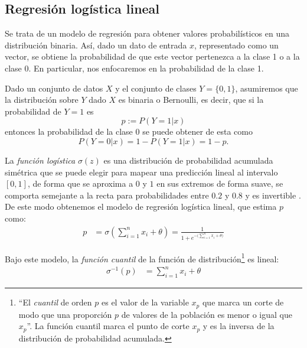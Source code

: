 \subsection{Regresión logística lineal}

Se trata de un modelo de regresión para obtener valores probabilísticos en una distribución binaria. Así, dado un dato de entrada $x$, representado como un vector, se obtiene la probabilidad de que este vector pertenezca a la clase 1 o a la clase 0. En particular, nos enfocaremos en la probabilidad de la clase 1.

Dado un conjunto de datos $X$ y el conjunto de clases $Y = \{0,1\}$, asumiremos que la distribución sobre $Y$ dado $X$ es binaria o Bernoulli, es decir, que si la probabilidad de $Y=1$ es $$p := P(Y=1|x)$$ entonces la probabilidad de la clase 0 se puede obtener de esta como $$P(Y=0|x) = 1-P(Y=1|x) = 1-p.$$




La \emph{función logística} $\sigma(z)$ es una distribución de probabilidad acumulada simétrica que se puede elegir para mapear una predicción lineal al intervalo $[0,1]$, de forma que se aproxima a $0$ y $1$ en sus extremos de forma suave, se comporta semejante a la recta para probabilidades entre $0.2$ y $0.8$ y es invertible \parencite{Fox2016}.  De este modo obtenemos el modelo de regresión logística lineal, que estima $p$ como:
\begin{align*}
 p &= \sigma \left(\sum_{i=1}^n x_i + \theta \right) = \frac{1}{1 + e^{-\big(\sum_{i=1}^n x_i + \theta\big)}}
\end{align*}

Bajo este modelo, la \emph{función cuantil} de la función de distribución\footnote{``El \textit{cuantil} de orden $p$ es el valor de la variable $x_p$ que marca un corte de modo que una proporción $p$ de valores de la población es menor o igual que $x_{p}$''.  La función cuantil marca el punto de corte $x_p$ y es la inversa de la distribución de probabilidad acumulada. } es lineal:
\begin{align}
 \sigma^{-1}(p) &= \sum_{i=1}^n x_i + \theta \label{eq:cuantil}
\end{align}

